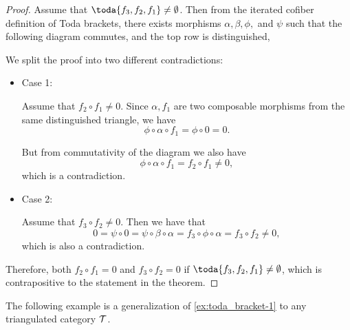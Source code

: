 \begin{proof}
	Assume that \( \toda{f_3, f_2, f_1} \neq \emptyset \). Then from the iterated cofiber definition of Toda brackets, there exists morphisms \( \alpha, \beta, \phi, \) and \( \psi \) such that the following diagram commutes, and the top row is distinguished,
	\begin{center}
	\end{center}

	We split the proof into two different contradictions:

	\begin{itemize}
		\item{
			Case 1:

			Assume that \( f_2 \circ f_1 \neq 0 \). Since \( \alpha, f_1 \) are two composable morphisms from the same distinguished triangle, we have
			\[
				\phi \circ \alpha \circ f_1 = \phi \circ 0 = 0.
			\]

			But from commutativity of the diagram we also have
			\[
				\phi \circ \alpha \circ f_1 = f_2 \circ f_1 \neq 0,
			\]
			which is a contradiction.
		}
		\item{
			Case 2:

			Assume that \( f_3 \circ f_2 \neq 0 \). Then we have that
			\[
				0 = \psi \circ 0 = \psi \circ \beta \circ \alpha = f_3 \circ \phi \circ \alpha = f_3 \circ f_2 \neq 0,
			\]
			which is also a contradiction.
		}
	\end{itemize}

	Therefore, both \( f_2 \circ f_1 = 0 \) and \( f_3 \circ f_2 = 0 \) if \( \toda{f_3, f_2, f_1} \neq \emptyset \), which is contrapositive to the statement in the theorem.
\end{proof}

The following example is a generalization of \autoref{ex:toda_bracket-1} to any triangulated category \( {\mathcal{T}} \).

